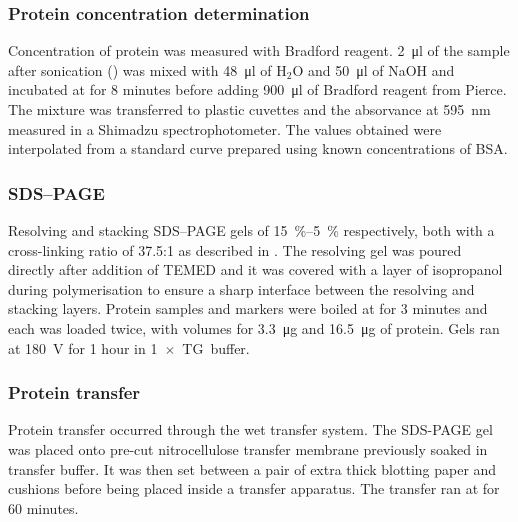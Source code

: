     \subsubsection{Protein concentration determination}
      Concentration of protein was measured with Bradford reagent. \SI{2}{\ul} of the
      sample after sonication () was mixed with \SI{48}{\ul} of H$_2$O
      and \SI{50}{\ul} of NaOH and incubated at  for 8 minutes before adding
      \SI{900}{\ul} of Bradford reagent from Pierce. The mixture was transferred to plastic
      cuvettes and the absorvance at \SI{595}{\nm} measured in a Shimadzu spectrophotometer. The
      values obtained were interpolated from a standard curve prepared using known concentrations
      of BSA.
    
    \subsubsection{SDS--PAGE}
      Resolving and stacking SDS--PAGE gels of \SIrange{15}{5}{\percent} respectively, both with a
      cross-linking ratio of \num{37.5}:1 as described in \citet{harlow_electrophoresis_1988}. The
      resolving gel was poured directly after addition
      of TEMED and it was covered with a layer of isopropanol during polymerisation
      to ensure a sharp interface between the resolving and stacking layers.
      Protein samples and markers were boiled at  for 3 minutes and each
      was loaded twice, with volumes for \SI{3.3}{\ug} and \SI{16.5}{\ug} of protein. Gels ran at
      \SI{180}{\volt} for 1 hour in \SI{1}{$\times$} TG buffer.
    
    \subsubsection{Protein transfer}
      Protein transfer occurred through the wet transfer system. The SDS-PAGE gel
      was placed onto pre-cut nitrocellulose transfer membrane previously soaked in
      transfer buffer. It was then set between a pair of extra thick blotting paper and
      cushions before being placed inside a transfer apparatus. The transfer ran at
       for 60 minutes.
    
